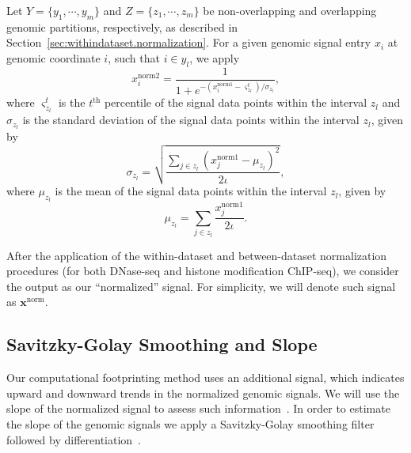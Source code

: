 Let ${Y} = \{ {y}_{1}, \cdots, {y}_{m} \}$ and ${Z} = \{ {z}_{1}, \cdots, {z}_{m} \}$ be non-overlapping and overlapping genomic partitions, respectively, as described in Section~\ref{sec:withindataset.normalization}. For a given genomic signal entry $x_i$ at genomic coordinate $i$, such that $i \in {y}_{l}$, we apply
\begin{equation}
  \label{eq:signal.between.norm.local}
  {x}^{\text{norm2}}_{i} = \frac{1}{1+e^{{-({x}^{\text{norm1}}_{i}-{\varsigma}^{t}_{{z}_{l}})}/{\sigma}_{{z}_{l}}}},
\end{equation}
where ${\varsigma}^{t}_{{z}_{l}}$ is the $t^{\text{th}}$ percentile of the signal data points within the interval ${z}_{l}$ and $\sigma_{{z}_{l}}$ is the standard deviation of the signal data points within the interval ${z}_{l}$, given by
\begin{equation}
  \label{eq:signal.between.var.local}
  \sigma_{{z}_{l}} = \sqrt{ \frac{\sum_{j \in {z}_{l}} \left({x}^{\text{norm1}}_{j} - \mu_{{z}_{l}}\right)^2}{2\iota} },
\end{equation}
where $\mu_{{z}_{l}}$ is the mean of the signal data points within the interval ${z}_{l}$, given by
\begin{equation}
  \label{eq:signal.between.mean.local}
  \mu_{{z}_{l}} = \sum_{j \in {z}_{l}} \frac{{x}^{\text{norm1}}_{j}}{2\iota}.
\end{equation}

After the application of the within-dataset and between-dataset normalization procedures (for both DNase-seq and histone modification ChIP-seq), we consider the output as our ``normalized'' signal. For simplicity, we will denote such signal as $\mathbf{x}^{\text{norm}}$.

\subsection{Savitzky-Golay Smoothing and Slope}
\label{sec:savitzkygolay.smoothing.slope}

Our computational footprinting method uses an additional signal, which indicates upward and downward trends in the normalized genomic signals. We will use the slope of the normalized signal to assess such information~\citep{boyle2011}. In order to estimate the slope of the genomic signals we apply a Savitzky-Golay smoothing filter followed by differentiation~\citep{madden1978,luo2005}.

